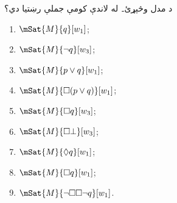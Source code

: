 \documentclass[../../../include/open-logic-section]{subfiles}
\begin{document}
\begin{prob}
  د  مدل وڅېړئ۔ له لاندې کومې
  جملې رښتيا دي؟
    \begin{enumerate}
    \item $\mSat{M}{q}[w_1]$;
    \item $\mSat{M}{\lnot q}[w_3]$;
    \item $\mSat{M}{p \lor q}[w_1]$;
    \item $\mSat{M}{\Box (p \lor q)}[w_1]$;
    \item $\mSat{M}{\Box q}[w_3]$;
    \item $\mSat{M}{\Box \bot}[w_3]$;
    \item $\mSat{M}{\Diamond q}[w_1]$;
    \item $\mSat{M}{\Box q}[w_1]$;
    \item $\mSat{M}{\lnot \Box\Box \lnot q}[w_1]$.
    \end{enumerate}
\end{prob}
\end{document}
